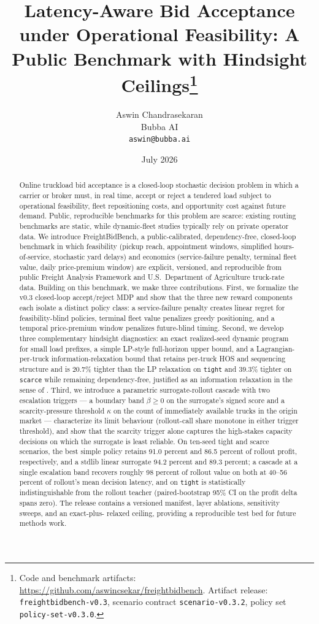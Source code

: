 \documentclass[11pt]{article}
\title{Latency-Aware Bid Acceptance under Operational Feasibility:
A Public Benchmark with Hindsight Ceilings\thanks{Code and benchmark
artifacts: \url{https://github.com/aswincsekar/freightbidbench}. Artifact
release: \texttt{freightbidbench-v0.3}, scenario contract
\texttt{scenario-v0.3.2}, policy set \texttt{policy-set-v0.3.0}.}}
\author{Aswin Chandrasekaran \\ Bubba AI \\ \texttt{aswin@bubba.ai}}
\date{July 2026}
\begin{document}
\maketitle

\begin{abstract}
Online truckload bid acceptance is a closed-loop stochastic decision problem
in which a carrier or broker must, in real time, accept or reject a tendered
load subject to operational feasibility, fleet repositioning costs, and
opportunity cost against future demand. Public, reproducible benchmarks for
this problem are scarce: existing routing benchmarks are static, while
dynamic-fleet studies typically rely on private operator data. We introduce
FreightBidBench, a public-calibrated, dependency-free, closed-loop benchmark
in which feasibility (pickup reach, appointment windows, simplified
hours-of-service, stochastic yard delays) and economics
(service-failure penalty, terminal fleet value, daily price-premium window)
are explicit, versioned, and reproducible from public Freight Analysis
Framework and U.S.\ Department of Agriculture truck-rate data. Building on
this benchmark, we make three contributions. First, we formalize the v0.3
closed-loop accept/reject MDP and show that the three new reward components
each isolate a distinct policy class: a service-failure penalty creates
linear regret for feasibility-blind policies, terminal fleet value penalizes
greedy positioning, and a temporal price-premium window penalizes
future-blind timing. Second, we develop three complementary hindsight
diagnostics: an exact realized-seed dynamic program for small load
prefixes, a simple LP-style full-horizon upper bound, and a
Lagrangian-per-truck information-relaxation bound that retains per-truck
HOS and sequencing structure and is $20.7\%$ tighter than the LP
relaxation on \texttt{tight} and $39.3\%$ tighter on \texttt{scarce}
while remaining dependency-free, justified as an information relaxation
in the sense of \citet{brown2010information}. Third,
we introduce a parametric surrogate-rollout cascade with two escalation
triggers --- a boundary band $\beta \geq 0$ on the surrogate's signed
score and a scarcity-pressure threshold $\kappa$ on the count of
immediately available trucks in the origin market --- characterize its
limit behaviour (rollout-call share monotone in either trigger
threshold), and show that the scarcity trigger alone captures the
high-stakes capacity decisions on which the surrogate is least reliable. On ten-seed tight and scarce
scenarios, the best simple policy retains 91.0 percent and 86.5 percent of
rollout profit, respectively, and a stdlib linear surrogate 94.2 percent and
89.3 percent; a cascade at a single escalation band recovers roughly 98 percent
of rollout value on both at 40--56 percent of rollout's mean decision latency,
and on \texttt{tight} is statistically indistinguishable from the rollout
teacher (paired-bootstrap 95\% CI on the profit delta spans zero). The release contains a
versioned manifest, layer ablations, sensitivity sweeps, and an exact-plus-
relaxed ceiling, providing a reproducible test bed for future methods work.
\end{abstract}
\end{document}
